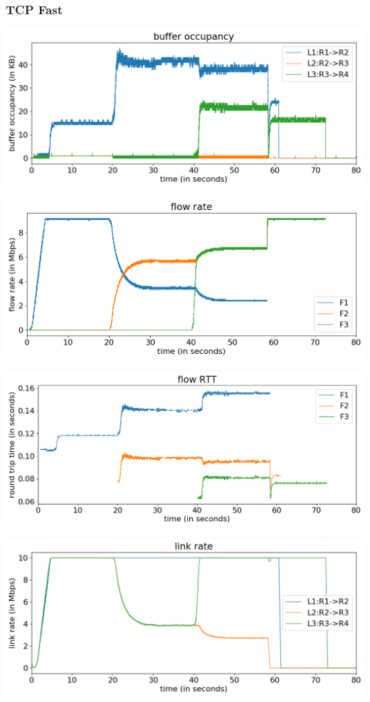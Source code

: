 \documentclass{article}
\begin{document}
\subsubsection{TCP Fast}

\includegraphics[width = \textwidth]{"test_case2_fast buffer occupancy"}

\includegraphics[width = \textwidth]{"test_case2_fast flow rate"}

\includegraphics[width = \textwidth]{"test_case2_fast flow RTT"}

\includegraphics[width = \textwidth]{"test_case2_fast link rate"}
\end{document}

